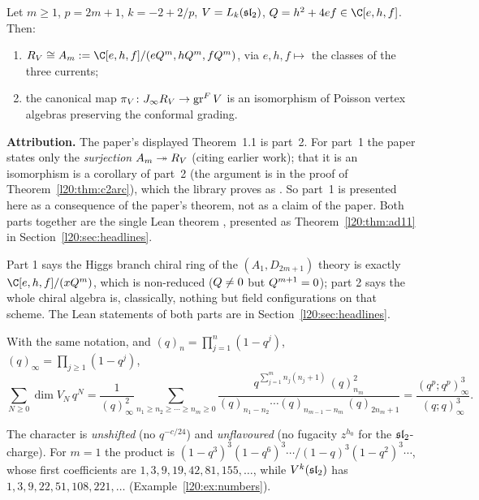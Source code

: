 \begin{theorem}\label{l20:thm:paper11}
Let $m\ge1$, $p=2m+1$, $k=-2+2/p$, $V=L_k(\mathfrak{sl}_2)$, $\ltwentyQ=h^2+4ef\in\C[e,h,f]$. Then:
\begin{enumerate}
\item $R_V\cong\ltwentyA:=\C[e,h,f]/(e\ltwentyQ^m,h\ltwentyQ^m,f\ltwentyQ^m)$, via $e,h,f\mapsto$ the
  classes of the three currents;
\item the canonical map $\pi_V\colon J_\infty R_V\to\operatorname{gr}^F V$ is an isomorphism of Poisson vertex
  algebras preserving the conformal grading.
\end{enumerate}
\end{theorem}
\noindent\textbf{Attribution.} The paper's displayed Theorem~1.1 is part~2. For part~1 the paper states only the
\emph{surjection} $A_m\twoheadrightarrow R_V$ (citing earlier work); that it is an isomorphism is a corollary of
part~2 (the argument is in the proof of Theorem~\ref{l20:thm:c2arc}), which the library proves as
. So part~1 is presented here as a consequence of the paper's theorem, not as a claim of the paper.
Both parts together are the single Lean theorem , presented as Theorem~\ref{l20:thm:ad11}
in Section~\ref{l20:sec:headlines}.

\begin{physics}
Part 1 says the Higgs branch chiral ring of the $(A_1,D_{2m+1})$ theory is exactly
$\C[e,h,f]/(x\ltwentyQ^m)$, which is non-reduced ($Q\neq0$ but $Q^{m+1}=0$); part 2 says the whole chiral algebra is, classically, nothing but
field configurations on that scheme. The Lean statements of both parts are in Section~\ref{l20:sec:headlines}.
\end{physics}

\begin{theorem}\label{l20:thm:paper12}
With the same notation, and $(q)_n=\prod_{j=1}^n(1-q^j)$, $(q)_\infty=\prod_{j\ge1}(1-q^j)$,
\begin{equation}\label{l20:eq:fermionic}
\sum_{N\ge0}\dim V_N\,q^N=\frac{1}{(q)_\infty^2}\sum_{n_1\ge n_2\ge\cdots\ge n_m\ge0}
\frac{q^{\sum_{j=1}^mn_j(n_j+1)}\,(q)_{n_m}^2}{(q)_{n_1-n_2}\cdots(q)_{n_{m-1}-n_m}\,(q)_{2n_m+1}}
=\frac{(q^p;q^p)_\infty^3}{(q;q)_\infty^3}.
\end{equation}
\end{theorem}

The character is \emph{unshifted} (no $q^{-c/24}$) and \emph{unflavoured} (no fugacity $z^{h_0}$ for the
$\mathfrak{sl}_2$-charge). For $m=1$ the product is $(1-q^3)^3(1-q^6)^3\cdots/(1-q)^3(1-q^2)^3\cdots$, whose
first coefficients are $1,3,9,19,42,81,155,\dots$, while $V^k(\mathfrak{sl}_2)$ has $1,3,9,22,51,108,221,\dots$
(Example~\ref{l20:ex:numbers}).


